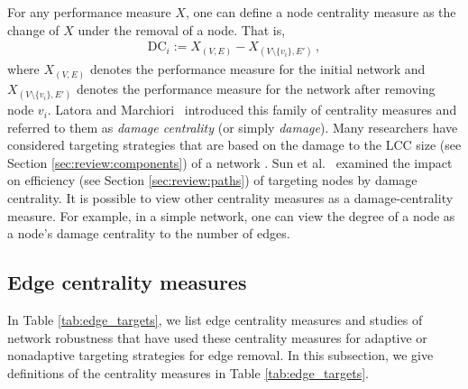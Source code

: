 \documentclass{comnet-mod}
\begin{document}
For any performance measure $X$, one can define a node centrality measure as the change of $X$ under the removal of a node.  That is,
\begin{align}
	\textrm{DC}_i := X_{(V,E)}-X_{(V\setminus\{v_i\},E')}\,,\nonumber
\end{align}
where $X_{(V,E)}$ denotes the performance measure for the initial network and $X_{(V\setminus\{v_i\},E')}$ denotes the performance measure for the network after removing node $v_i$. Latora and Marchiori~\cite{Latora2005} introduced this family of centrality measures and referred to them as \textit{damage centrality} (or simply \textit{damage}). Many researchers have considered targeting strategies that are based on the damage to the LCC size (see Section \ref{sec:review:components}) of a network \cite{Lordan2014, Wang2014a}. Sun et al.~\cite{Sun2017} examined the impact on efficiency (see Section \ref{sec:review:paths}) of targeting nodes by damage centrality. It is possible to view other centrality measures as a damage-centrality measure. For example, in a simple network, one can view the degree of a node as a node's damage centrality to the number of edges.


\subsection{Edge centrality measures}\label{sec:edge_centralities}

In Table \ref{tab:edge_targets}, we list edge centrality measures and studies of network robustness that have used these centrality measures for adaptive or nonadaptive targeting strategies for edge removal. In this subsection, we give definitions of the centrality measures in Table \ref{tab:edge_targets}.
\end{document}
